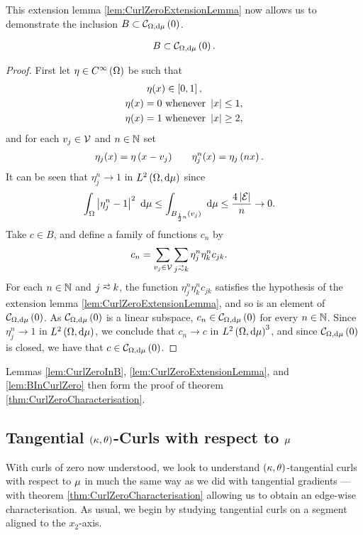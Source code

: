 This extension lemma \ref{lem:CurlZeroExtensionLemma} now allows us to demonstrate the inclusion $B\subset\mathcal{C}_{ \Omega, \mathrm{d}\mu}\left( 0 \right)$.
\begin{lemma} \label{lem:BInCurlZero}
	\begin{align*}
		B \subset \mathcal{C}_{ \Omega, \mathrm{d}\mu}\left( 0 \right).
	\end{align*}
\end{lemma}
\begin{proof}
	First let $\eta\in C^{\infty}\left( \Omega \right)$ be such that
	\begin{align*}
		\eta(x) &\in\left[ 0,1 \right], \\
		\eta(x) = 0 \ &\text{whenever } \left\lvert x \right\rvert \leq 1, \\
		\eta(x) = 1 \ &\text{whenever } \left\lvert x \right\rvert \geq 2,
	\end{align*}
	and for each $v_j\in\mathcal{V}$ and $n\in\mathbb{N}$ set
	\begin{align*}
		\eta_j(x) = \eta\left( x - v_j \right) &\qquad \eta_j^n(x) = \eta_j\left( nx \right).
	\end{align*}
	It can be seen that $\eta_j^n\rightarrow 1$ in $L^{2}\left( \Omega,\mathrm{d}\mu \right)$ since
	\begin{align*}
		\int_{\Omega} \left\lvert \eta_j^n - 1 \right\rvert^2  \ \mathrm{d}\mu 
		&\leq \int_{ B_{\frac{1}{2}{n}}(v_j)}  \ \mathrm{d}\mu \leq \frac{4\left\lvert \mathcal{E} \right\rvert}{n} \rightarrow 0.
	\end{align*}
	Take $c\in B$, and define a family of functions $c_n$ by
	\begin{align*}
		c_n &= \sum_{v_j\in\vertSet}\sum_{j\conLeft k} \eta_j^n \eta_k^n c_{jk}.
	\end{align*}
	For each $n\in\mathbb{N}$ and $j\conLeft k$, the function $\eta_j^n \eta_k^n c_{jk}$ satisfies the hypothesis of the extension lemma \ref{lem:CurlZeroExtensionLemma}, and so is an element of $\mathcal{C}_{ \Omega, \mathrm{d}\mu}\left( 0 \right)$.
	As $\mathcal{C}_{ \Omega, \mathrm{d}\mu}\left( 0 \right)$ is a linear subspace, $c_n\in\mathcal{C}_{ \Omega, \mathrm{d}\mu}\left( 0 \right)$ for every $n\in\mathbb{N}$.
	Since $\eta_j^n\rightarrow 1$ in $L^{2}\left( \Omega,\mathrm{d}\mu \right)$, we conclude that $c_n\rightarrow c$ in $L^{2}\left( \Omega,\mathrm{d}\mu \right)^3$, and since $\mathcal{C}_{ \Omega, \mathrm{d}\mu}\left( 0 \right)$ is closed, we have that $c\in\mathcal{C}_{ \Omega, \mathrm{d}\mu}\left( 0 \right)$.
\end{proof}
Lemmas \ref{lem:CurlZeroInB}, \ref{lem:CurlZeroExtensionLemma}, and \ref{lem:BInCurlZero} then form the proof of theorem \ref{thm:CurlZeroCharacterisation}.

\subsection{Tangential $\left( \kappa, \theta \right)$-Curls with respect to $\mu$} \label{apps:TangentialCurls}
With curls of zero now understood, we look to understand $\left( \kappa, \theta \right)$-tangential curls with respect to $\mu$ in much the same way as we did with tangential gradients --- with theorem \ref{thm:CurlZeroCharacterisation} allowing us to obtain an edge-wise characterisation.
As usual, we begin by studying tangential curls on a segment aligned to the $x_2$-axis.

